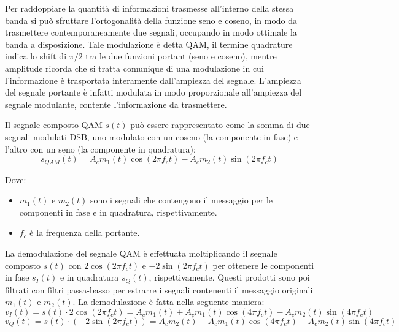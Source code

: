 Per raddoppiare la quantità di informazioni trasmesse all'interno della stessa banda si può sfruttare l'ortogonalità della funzione seno e coseno, in modo da trasmettere contemporaneamente due segnali, occupando in modo ottimale la banda a disposizione. Tale modulazione è detta QAM, il termine quadrature indica lo shift di $\pi/2$ tra le due funzioni portant (seno e coseno), mentre amplitude ricorda che si tratta comunique di una modulazione in cui l'informazione è trasportata interamente dall'ampiezza del segnale. L'ampiezza del segnale portante è infatti modulata in modo proporzionale all'ampiezza del segnale modulante, contente l'informazione da trasmettere.





Il segnale composto QAM \( s(t) \) può essere rappresentato come la somma di due segnali modulati DSB, uno modulato con un coseno (la componente in fase) e l'altro con un seno (la componente in quadratura):
\begin{equation}
s_{QAM}(t) = A_{c} m_1(t) \cos(2\pi f_c t) - A_{c} m_2(t) \sin(2\pi f_c t)
\end{equation}

Dove:
\begin{itemize}
    \item \( m_1(t) \) e \( m_2(t) \) sono i segnali che contengono il messaggio per le componenti in fase e in quadratura, rispettivamente.
    \item \( f_c \) è la frequenza della portante.
\end{itemize}


La demodulazione del segnale QAM è effettuata moltiplicando il segnale composto \( s(t) \) con \( 2\cos(2\pi f_c t) \) e \( -2\sin(2\pi f_c t) \) per ottenere le componenti in fase \( s_I(t) \) e in quadratura \( s_Q(t) \), rispettivamente.
Questi prodotti sono poi filtrati con filtri passa-basso per estrarre i segnali contenenti il messaggio originali \( m_1(t) \) e \( m_2(t) \).
La demodulazione è fatta nella seguente maniera:
\begin{equation}
    v_I(t) = s(t) \cdot 2\cos(2\pi f_c t) = A_{c} m_1(t) + A_{c} m_1(t) \cos(4\pi f_c t) - A_{c} m_2(t) \sin(4\pi f_c t)
\end{equation}
\begin{equation}
    v_Q(t) = s(t) \cdot (-2\sin(2\pi f_c t)) = A_{c} m_2(t) - A_{c} m_1(t) \cos(4\pi f_c t) - A_{c} m_2(t) \sin(4\pi f_c t)
\end{equation}

